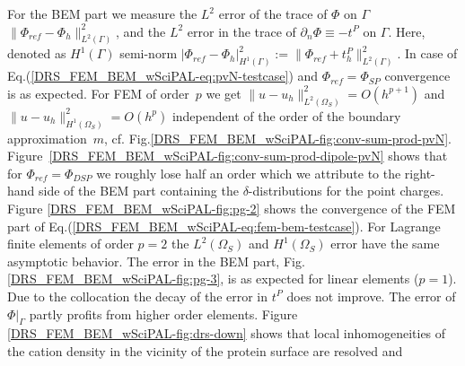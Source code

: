 \documentclass[runningheads]{lncse}
\newcommand{\mydiff}[2]{{}{#2}}
\begin{document}
%
For the BEM part we measure the $L^2$ error of the trace of $\Phi$ on $\Gamma$
$
\| \Phi_{ref} - \Phi_h\|^2_{L^2(\Gamma)}  %
$, and the 
%
$L^2$ error in the trace of $\partial_n\Phi \equiv -t^P$ on $\Gamma$.
Here, denoted as $H^1(\Gamma)$ semi-norm
$ | \Phi_{ref} - \Phi_h |^2_{H^1(\Gamma)}  :=  \| \Phi_{ref} + t^P_h \|^2_{L^2(\Gamma)} $.
%
In case of Eq.(\ref{DRS_FEM_BEM_wSciPAL-eq:pvN-testcase}) and $\Phi_{ref} = \Phi_{SP}$ convergence is as expected. 
%
%
For FEM of order~$p$ we get $\| u - u_h\|^2_{L^2(\Omega_S)} = O(h^{p+1})$ and $\| u - u_h\|^2_{H^1(\Omega_S)} = O(h^{p})$ independent of \mydiff{}{the order of the boundary approximation}~$m$, cf. Fig.\ref{DRS_FEM_BEM_wSciPAL-fig:conv-sum-prod-pvN}.
%
Figure~\ref{DRS_FEM_BEM_wSciPAL-fig:conv-sum-prod-dipole-pvN} shows that for $\Phi_{ref} = \Phi_{DSP}$ we roughly lose half an order which we attribute to the right-hand side of the BEM part containing the $\delta$-distributions for the point charges.
%
Figure \ref{DRS_FEM_BEM_wSciPAL-fig:pg-2} shows the convergence of the FEM part of Eq.(\ref{DRS_FEM_BEM_wSciPAL-eq:fem-bem-testcase}). 
%
For \mydiff{}{Lagrange finite elements of order }$p=2$ the $L^2(\Omega_S)$ and $H^1(\Omega_S)$ error have the same asymptotic behavior.
%
The error in the BEM part, Fig.\ref{DRS_FEM_BEM_wSciPAL-fig:pg-3}, is as expected for linear elements ($p=1$). Due to the collocation the decay of the error in $t^P$ does not improve. 
%
The error of $\Phi|_{\Gamma}$ partly profits from higher order elements.
%
Figure \ref{DRS_FEM_BEM_wSciPAL-fig:drs-down} shows that
local inhomogeneities of the cation density in the vicinity of the protein surface
are resolved and
%
\end{document}
